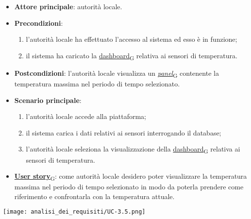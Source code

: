 \newpage

\begin{itemize}
	\item \textbf{Attore principale}: autorità locale.
	\item \textbf{Precondizioni}:
	      \begin{enumerate}
		      \item l'autorità locale ha effettuato l'accesso al sistema ed esso è in funzione;
		      \item il sistema ha caricato la \href{https://7last.github.io/docs/rtb/documentazione-interna/glossario\#dashboard}{dashboard\textsubscript{G}} relativa ai sensori di temperatura.
	      \end{enumerate}
	\item \textbf{Postcondizioni}: l'autorità locale visualizza un \href{https://7last.github.io/docs/rtb/documentazione-interna/glossario\#panel}{\textit{panel}\textsubscript{G}} contenente la temperatura massima nel periodo di tempo selezionato.
	\item \textbf{Scenario principale}:
	      \begin{enumerate}
		      \item l'autorità locale accede alla piattaforma;
		      \item il sistema carica i dati relativi ai sensori interrogando il database;
		      \item l'autorità locale seleziona la visualizzazione della \href{https://7last.github.io/docs/rtb/documentazione-interna/glossario\#dashboard}{dashboard\textsubscript{G}} relativa ai sensori di temperatura.
	      \end{enumerate}
	\item \href{https://7last.github.io/docs/rtb/documentazione-interna/glossario\#user-story}{\textbf{User story}\textsubscript{G}}:
	      come autorità locale desidero poter visualizzare la temperatura massima nel periodo di tempo selezionato
	      in modo da poterla prendere come riferimento e confrontarla con la temperatura attuale.
\end{itemize}
\begin{center}
	\texttt{[image: analisi\_dei\_requisiti/UC-3.5.png]}
\end{center}

